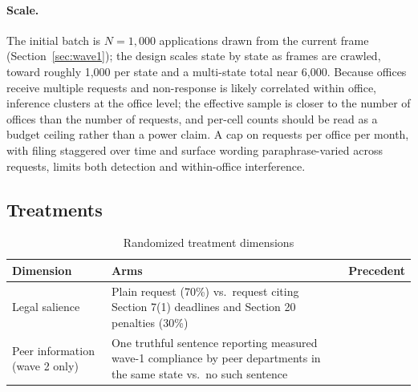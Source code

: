 \documentclass[11pt]{article}
\begin{document}
\paragraph{Scale.} The initial batch is $N=1{,}000$ applications drawn from the current frame (Section~\ref{sec:wave1}); the design scales state by state as frames are crawled, toward roughly 1,000 per state and a multi-state total near 6,000. Because offices receive multiple requests and non-response is likely correlated within office, inference clusters at the office level; the effective sample is closer to the number of offices than the number of requests, and per-cell counts should be read as a budget ceiling rather than a power claim. A cap on requests per office per month, with filing staggered over time and surface wording paraphrase-varied across requests, limits both detection and within-office interference.

\subsection{Treatments}
\label{sec:treatments}

\begin{table}[htbp]
\centering
\caption{Randomized treatment dimensions}
\label{tab:treatments}
\small
\begin{tabularx}{\textwidth}{lLL}
\toprule
Dimension & Arms & Precedent \\
\midrule
Legal salience & Plain request (70\%) vs.\ request citing Section 7(1) deadlines and Section 20 penalties (30\%) & \citet{spac2018, cuillier2010} \\
Peer information (wave 2 only) & One truthful sentence reporting measured wave-1 compliance by peer departments in the same state vs.\ no such sentence & \citet{benaaron2017} \\
\bottomrule
\end{tabularx}
\end{table}
\end{document}
